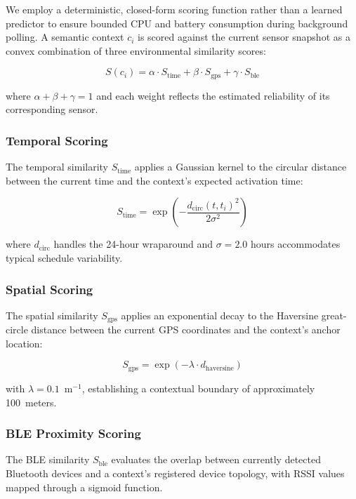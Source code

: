 We employ a deterministic, closed-form scoring function rather than a learned predictor to ensure bounded CPU and battery consumption during background polling. A semantic context $c_i$ is scored against the current sensor snapshot as a convex combination of three environmental similarity scores:

\begin{equation}
S(c_i) = \alpha \cdot S_{\text{time}} + \beta \cdot S_{\text{gps}} + \gamma \cdot S_{\text{ble}}
\label{eq:scoring}
\end{equation}

\noindent where $\alpha + \beta + \gamma = 1$ and each weight reflects the estimated reliability of its corresponding sensor.

\subsubsection{Temporal Scoring}
The temporal similarity $S_{\text{time}}$ applies a Gaussian kernel to the circular distance between the current time and the context's expected activation time:

\begin{equation}
S_{\text{time}} = \exp\!\left(-\frac{d_{\text{circ}}(t, t_i)^2}{2\sigma^2}\right)
\label{eq:time_score}
\end{equation}

\noindent where $d_{\text{circ}}$ handles the 24-hour wraparound and $\sigma = 2.0$ hours accommodates typical schedule variability.

\subsubsection{Spatial Scoring}
The spatial similarity $S_{\text{gps}}$ applies an exponential decay to the Haversine great-circle distance between the current GPS coordinates and the context's anchor location:

\begin{equation}
S_{\text{gps}} = \exp(-\lambda \cdot d_{\text{haversine}})
\label{eq:gps_score}
\end{equation}

\noindent with $\lambda = 0.1$~m$^{-1}$, establishing a contextual boundary of approximately 100~meters.

\subsubsection{BLE Proximity Scoring}
The BLE similarity $S_{\text{ble}}$ evaluates the overlap between currently detected Bluetooth devices and a context's registered device topology, with RSSI values mapped through a sigmoid function.

